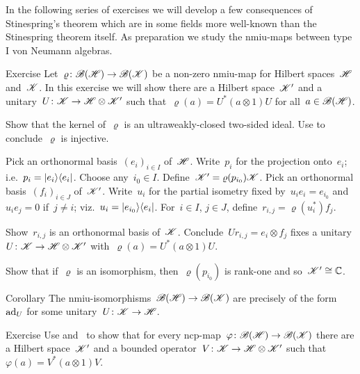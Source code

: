 \documentclass[b]{subfiles}
\begin{document}
\begin{parsec}%
\begin{point}%
In the following series of exercises we will develop
    a few consequences of Stinespring's theorem
    which are in some fields more well-known than
    the Stinespring theorem itself.
As preparation we study the nmiu-maps between type I von Neumann algebras.
\end{point}
\begin{point}{Exercise}%
Let~$\varrho\colon \mathscr{B}(\mathscr{H}) \to \mathscr{B}(\mathscr{K})$    
be a non-zero nmiu-map for Hilbert spaces~$\mathscr{H}$ and~$\mathscr{K}$.
In this exercise we will show
    there are a Hilbert space~$\mathscr{K}'$
    and a unitary~$U\colon \mathscr{K} \to \mathscr{H} \otimes \mathscr{K}'$
    such that~$\varrho(a) = U^* (a\otimes 1) U $
    for all~$a \in \mathscr{B}(\mathscr{H})$.

Show that the kernel of~$\varrho$
    is an ultraweakly-closed two-sided ideal.
Use 
    to conclude~$\varrho$ is injective.

Pick an orthonormal basis~$(e_i)_{i\in I}$
    of~$\mathscr{H}$.
Write~$p_i$ for the projection onto~$e_i$;
i.e.~$p_i = \ket{e_i}\!\bra{e_i}$.
Choose any~$i_0 \in I$.
Define~$\mathscr{K}' = \varrho(p_{i_0}) \mathscr{K}$.
Pick an orthonormal basis~$(f_i)_{i \in J}$ of~$\mathscr{K}'$.
Write~$u_i$
    for the partial isometry fixed by~$u_i e_i = e_{i_0}$
    and~$u_i e_j = 0$ if~$j \neq i$; viz.~$u_i = \ket{e_{i_0}}\!\bra{e_i}$.
For~$i\in I$, $j \in J$,
    define~$r_{i,j} = \varrho(u^*_i) f_j$.

Show~$r_{i,j}$ is an orthonormal basis of~$\mathscr{K}$.
Conclude~$ Ur_{i,j} = e_i \otimes f_j $
    fixes a unitary
    $U\colon \mathscr{K} \to \mathscr{H} \otimes \mathscr{K}'$
    with~$\varrho(a) = U^* (a\otimes 1) U $.

Show that if~$\varrho$ is an isomorphism,
    then~$\varrho(p_{i_0})$ is rank-one
    and so~$\mathscr{K}' \cong \mathbb{C}$.
\begin{point}{Corollary}%
The nmiu-isomorphisms~$\mathscr{B}(\mathscr{H}) \to \mathscr{B}(\mathscr{K})$
    are precisely of the form~$\mathrm{ad}_U$
    for some unitary~$U\colon \mathscr{K} \to \mathscr{H}$.
\end{point}
\end{point}
\begin{point}{Exercise}%
Use  and~ to show
    that for every ncp-map~$\varphi\colon \mathscr{B}(\mathscr{H}) \to \mathscr{B}(\mathscr{K})$
    there are a Hilbert space~$\mathscr{K}'$
    and a bounded operator~$V\colon \mathscr{K} \to \mathscr{H} \otimes \mathscr{K}'$
    such that~$\varphi(a) = V^* (a \otimes 1)V$.


\end{point}
\end{parsec}
\end{document}
